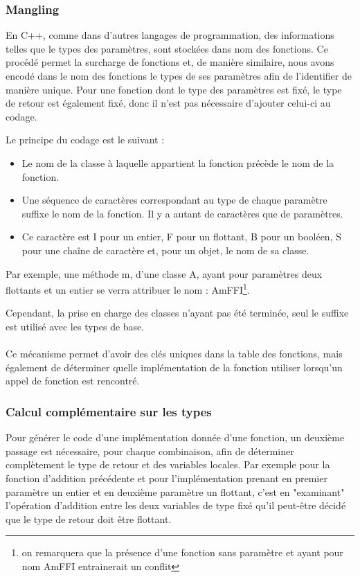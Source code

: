 \documentclass[12pt]{article}
\begin{document}
\subsubsection{Mangling}

En C++, comme dans d'autres langages de programmation, des informations telles
que le types des paramètres, sont stockées dans nom des fonctions. Ce procédé
permet la surcharge de fonctions et, de manière similaire, nous avons encodé dans le nom des fonctions le types de ses paramètres afin de l'identifier de manière unique. Pour une fonction dont le type des paramètres est fixé, le type de retour est également fixé, donc il n'est pas nécessaire d'ajouter celui-ci au codage.

Le principe du codage est le suivant :
\begin{itemize}
	\item Le nom de la classe à laquelle appartient la fonction précède le nom de la fonction.
	\item Une séquence de caractères correspondant au type de chaque paramètre suffixe le nom de la fonction. Il y a autant de caractères que de paramètres.
	\item Ce caractère est I pour un entier, F pour un flottant, B pour un booléen, S pour une chaîne de caractère et, pour un objet, le nom de sa classe.
\end{itemize}

Par exemple, une méthode m, d'une classe A, ayant pour paramètres deux flottants et un entier se verra attribuer le nom : AmFFI\footnote{on remarquera que la présence d'une fonction sans paramètre et ayant pour nom AmFFI entrainerait un conflit}.

Cependant, la prise en charge des classes n'ayant pas été terminée, seul le suffixe est utilisé avec les types de base.

\paragraph{}Ce mécanisme permet d'avoir des clés uniques dans la table des fonctions, mais également de déterminer quelle implémentation de la fonction utiliser lorsqu'un appel de fonction est rencontré.

\subsubsection{Calcul complémentaire sur les types}

Pour générer le code d'une implémentation donnée d'une fonction, un deuxième passage est nécessaire, pour chaque combinaison, afin de déterminer complètement le type de retour et des variables locales. Par exemple pour la fonction d'addition précédente et pour l'implémentation prenant en premier paramètre un entier et en deuxième paramètre un flottant, c'est en "examinant" l'opération d'addition entre les deux variables de type fixé qu'il peut-être décidé que le type de retour doit être flottant.
\end{document}

